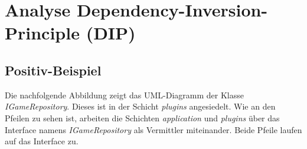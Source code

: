 \section{Analyse Dependency-Inversion-Principle (DIP)}
\subsection{Positiv-Beispiel}
Die nachfolgende Abbildung zeigt das UML-Diagramm der Klasse
\textit{IGameRepository}. Dieses ist in der Schicht \textit{plugins}
angesiedelt. Wie an den Pfeilen zu sehen ist, arbeiten die Schichten
\textit{application} und \textit{plugins} über das Interface
namens \textit{IGameRepository} als Vermittler miteinander. Beide
Pfeile laufen auf das Interface zu. 

